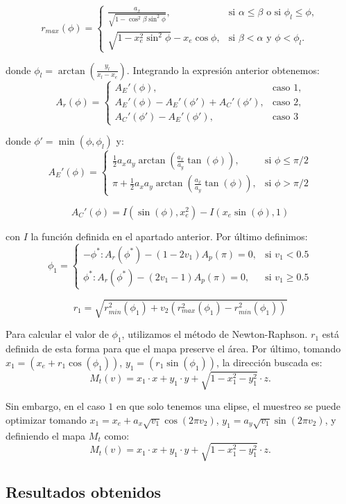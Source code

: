 \[ r_{max}(\phi) =
   \begin{cases}
      \frac{a_x}{\sqrt{1-\cos^2\beta\sin^2\phi}}, & \text{si }\alpha\leq\beta \text{ o si } \phi_l\leq\phi,\\
      \sqrt{1-x_e^2\sin^2\phi}-x_e\cos\phi, & \text{si } \beta< \alpha \text{ y } \phi < \phi_l.
   \end{cases}
  \]

donde $\phi_l=\arctan(\frac{y_l}{x_l-x_e})$. Integrando la expresión anterior obtenemos:
\[ A_r(\phi) =
   \begin{cases}
      A_E'(\phi), & \text{caso 1}, \\
      A_E'(\phi) - A_E'(\phi') + A_C'(\phi')  , & \text{caso 2}, \\
      A_C'(\phi') - A_E'(\phi'), & \text{caso 3} 
   \end{cases}
  \]

donde $\phi' = \min(\phi, \phi_l)$ y:
\[ A_E'(\phi) =
   \begin{cases}
        \frac{1}{2}a_xa_y\arctan(\frac{a_x}{a_y}\tan(\phi)), & \text{si $\phi\leq \pi/2$}\\
        \pi + \frac{1}{2}a_xa_y\arctan(\frac{a_x}{a_y}\tan(\phi)), & \text{si $\phi > \pi/2$}
   \end{cases}
   \]
   
$$A_C'(\phi) = I(\sin(\phi),x_e^2)-I(x_e\sin(\phi),1)$$

con $I$ la función definida en el apartado anterior. Por último definimos:
\[ \phi_1 = 
   \begin{cases} 
      -\phi^*: A_r(\phi^*)-(1-2v_1)A_p(\pi)=0,  & \text{si $v_1<0.5$} \\
      \phi^*:  A_r(\phi^*)-(2v_1-1)A_p(\pi)=0,  & \text{si $v_1\geq 0.5$}
   \end{cases}
\]

$$r_1 = \sqrt{r_{min}^2(\phi_1) + v_2 (r_{max}^2(\phi_1) - r_{min}^2(\phi_1))}$$

Para calcular el valor de $\phi_1$, utilizamos el método de Newton-Raphson. $r_1$ está definida de esta forma para que el mapa preserve el área. Por último, tomando $x_1 = (x_e + r_1\cos(\phi_1))$, $y_1 = (r_1\sin(\phi_1))$, la dirección buscada es:
$$M_t(v) = x_1\cdot x + y_1\cdot y + \sqrt{1-x_1^2-y_1^2} \cdot z.$$


Sin embargo, en el caso $1$ en que solo tenemos una elipse, el muestreo se puede optimizar tomando $x_1=x_e + a_x\sqrt{v_1}\cos(2\pi v_2)$, $y_1= a_y\sqrt{v_1}\sin(2\pi v_2)$, y definiendo el mapa $M_t$ como:
$$M_t(v) = x_1\cdot x + y_1\cdot y + \sqrt{1-x_1^2-y_1^2} \cdot z.$$


\subsection{Resultados obtenidos}

